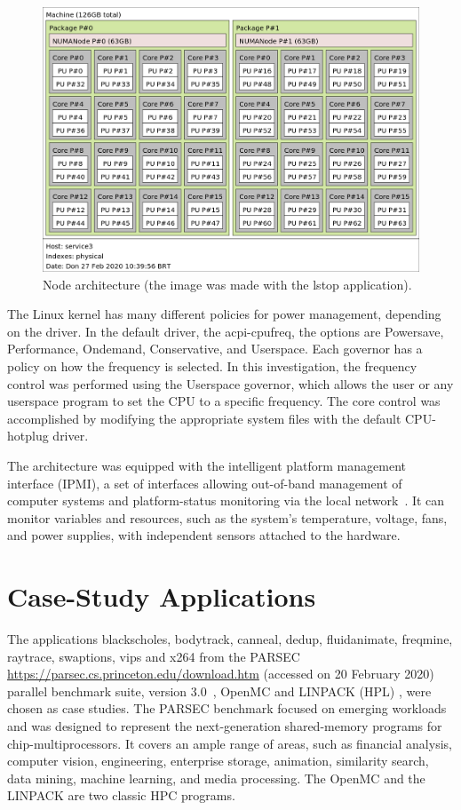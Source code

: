 \begin{figure}[H]
\centering
\includegraphics[width=\columnwidth]{models/figures/architecture.png}
\caption{Node architecture (the image was made with the lstop application).}
\label{fig:architecture}
\end{figure}

The Linux kernel has many different policies for power management, depending on the driver. In the default driver, the acpi-cpufreq, the options are Powersave, Performance, Ondemand, Conservative, and Userspace. Each governor has a policy on how the frequency is selected. In this investigation, the frequency control was performed using the Userspace governor, which allows the user or any userspace program to set the CPU to a specific frequency. The core control was accomplished by modifying the appropriate system files with the default CPU-hotplug driver.

The architecture was equipped with the intelligent platform management interface (IPMI), a set of interfaces allowing out-of-band management of computer systems and platform-status monitoring via the local network~\cite{Schwenkler2006IntelligentInterface}. It can monitor variables and resources, such as the system's temperature, voltage, fans, and power supplies, with independent sensors attached to the hardware.

\section{Case-Study Applications} \label{sec:casestudyapplication}
The applications blackscholes, bodytrack, canneal, dedup, fluidanimate, freqmine, raytrace, swaptions, vips and x264 from the PARSEC \url{https://parsec.cs.princeton.edu/download.htm} (accessed on 20 February  2020) parallel benchmark suite, version 3.0~\cite{Bienia2008TheSuite}, OpenMC \cite{Romano2015OpenMC:Development} and LINPACK (HPL) \cite{Dongarra1988TheExplanation}, were chosen as case studies. The PARSEC benchmark focused on emerging workloads and was designed to represent the next-generation shared-memory programs for chip-multiprocessors. It covers an ample range of areas, such as financial analysis, computer vision, engineering, enterprise storage, animation, similarity search, data mining, machine learning, and media processing. The OpenMC and the LINPACK are two classic HPC programs.

